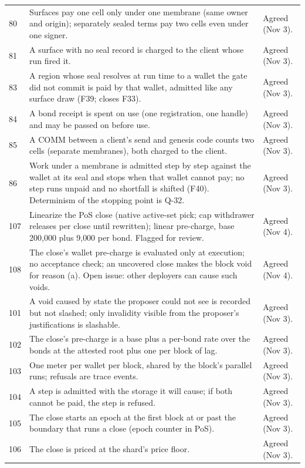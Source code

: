 \documentclass[11pt]{article}
\begin{document}
\begin{longtable}{@{}P{0.8cm}P{9.4cm}P{4.8cm}@{}}
80 & Surfaces pay one cell only under one membrane (same owner and origin); separately sealed terms pay two cells even under one signer. & Agreed (Nov 3). \\
81 & A surface with no seal record is charged to the client whose run fired it. & Agreed (Nov 3). \\
83 & A region whose seal resolves at run time to a wallet the gate did not commit is paid by that wallet, admitted like any surface draw (F39; closes F33). & Agreed (Nov 3). \\
84 & A bond receipt is spent on use (one registration, one handle) and may be passed on before use. & Agreed (Nov 3). \\
85 & A COMM between a client's send and genesis code counts two cells (separate membranes), both charged to the client. & Agreed (Nov 3). \\
86 & Work under a membrane is admitted step by step against the wallet at its seal and stops when that wallet cannot pay; no step runs unpaid and no shortfall is shifted (F40). Determinism of the stopping point is Q-32. & Agreed (Nov 3). \\
107 & Linearize the PoS close (native active-set pick; cap withdrawer releases per close until rewritten); linear pre-charge, base 200{,}000 plus 9{,}000 per bond. Flagged for review. & Agreed (Nov 4). \\
108 & The close's wallet pre-charge is evaluated only at execution; no acceptance check; an uncovered close makes the block void for reason (a). Open issue: other deployers can cause such voids. & Agreed (Nov 4). \\
101 & A void caused by state the proposer could not see is recorded but not slashed; only invalidity visible from the proposer's justifications is slashable. & Agreed (Nov 3). \\
102 & The close's pre-charge is a base plus a per-bond rate over the bonds at the attested root plus one per block of lag. & Agreed (Nov 3). \\
103 & One meter per wallet per block, shared by the block's parallel runs; refusals are trace events. & Agreed (Nov 3). \\
104 & A step is admitted with the storage it will cause; if both cannot be paid, the step is refused. & Agreed (Nov 3). \\
105 & The close starts an epoch at the first block at or past the boundary that runs a close (epoch counter in PoS). & Agreed (Nov 3). \\
106 & The close is priced at the shard's price floor. & Agreed (Nov 3). \\

\end{longtable}
\end{document}
